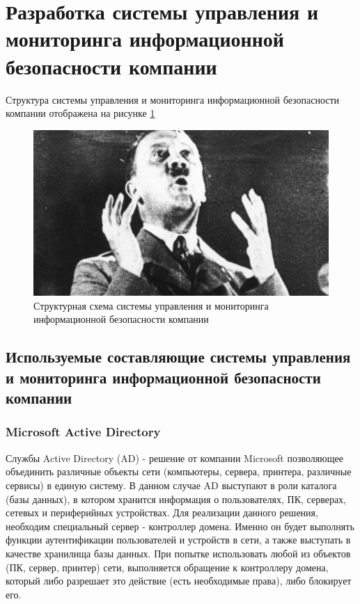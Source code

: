 \section{Разработка системы управления и мониторинга информационной безопасности компании}
\label{sec:development}
Структура системы управления и мониторинга информационной безопасности компании отображена на рисунке \ref{struct}

\begin{figure}[H]
  \centering
  \includegraphics[width=1\textwidth]{image/2.jpg}
  \caption{Структурная схема системы управления и мониторинга информационной безопасности компании}
  \label{struct}
\end{figure}

\subsection{Используемые составляющие системы управления и мониторинга информационной безопасности компании}

\subsubsection{Microsoft Active Directory}
Службы Active Directory (AD) - решение от компании Microsoft позволяющее объединить различные объекты сети (компьютеры, сервера, принтера, различные сервисы) в единую систему. В данном случае AD выступают в роли каталога (базы данных), в котором хранится информация о пользователях, ПК, серверах, сетевых и периферийных устройствах.
Для реализации данного решения, необходим специальный сервер - контроллер домена. Именно он будет выполнять функции аутентификации пользователей и устройств в сети, а также выступать в качестве хранилища базы данных. При попытке использовать любой из объектов (ПК, сервер, принтер) сети, выполняется обращение к контроллеру домена, который либо разрешает это действие (есть необходимые права), либо блокирует его.

